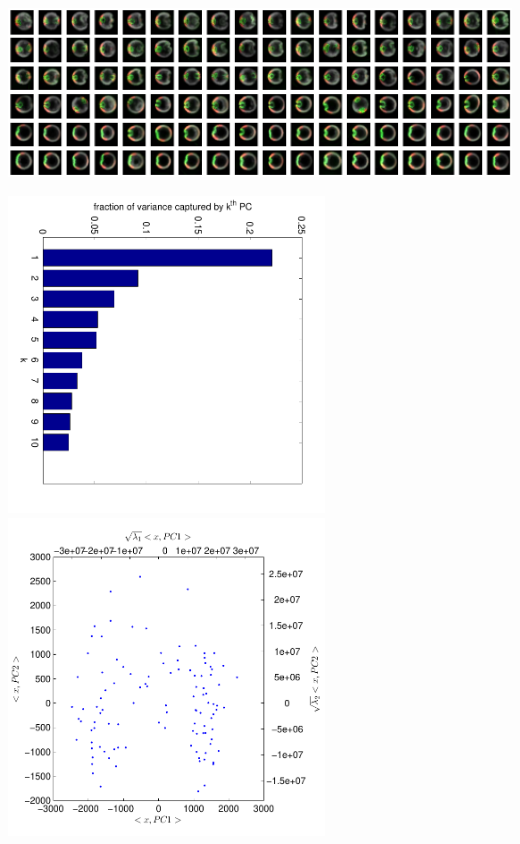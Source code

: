 \documentclass[12pt]{minimal}
\begin{document}
\centering

\noindent
{}
\includegraphics[width=16.8cm]{data2_PCA_ordered}

\noindent
{}
\includegraphics[width=8.4cm, angle=90]{data2_PCA_variance}
\includegraphics[width=8.4cm]{data2_PCA_proj}
\end{document}
